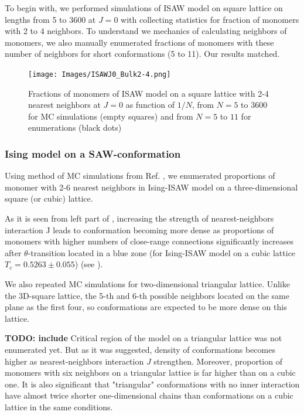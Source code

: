 \documentclass[a4paper]{jpconf}
\begin{document}
To begin with, we performed simulations of ISAW model on square lattice on lengths from 5 to 3600 at $J=0$ with collecting statistics for fraction of monomers with 2 to 4 neighbors. To understand we mechanics of calculating neighbors of monomers, we also manually enumerated fractions of monomers with these number of neighbors for short conformations (5 to 11). Our results matched.

\begin{figure}[h!]
    \centering
    \texttt{[image: Images/ISAWJ0\_Bulk2-4.png]}
    \caption{Fractions of monomers of ISAW model on a square lattice with 2-4 nearest neighbors at $J=0$ as function of $1/N$, from $N = 5$ to $3600$ for MC simulations (empty squares) and from $N = 5$ to $11$ for enumerations (black dots)}
    \label{fig:Ising_vs_ISAW}
\end{figure}

\subsubsection{Ising model on a SAW-conformation}

Using method of MC simulations from Ref. \cite{faizullina2021critical}, we enumerated proportions of monomer with 2-6 nearest neighbors in Ising-ISAW model on a three-dimensional square (or cubic) lattice.

As it is seen from left part of , increasing the strength of nearest-neighbors interaction J leads to conformation becoming more dense as proportions of monomers with higher numbers of close-range connections significantly increases after $\theta$-transition located in a blue zone (for Ising-ISAW model on a cubic lattice $T_{c} = 0.5263 \pm 0.055$\cite{Foster2021}) (see ).

We also repeated MC simulations for two-dimensional triangular lattice. Unlike the 3D-square lattice, the 5-th and 6-th possible neighbors located on the same plane as the first four, so conformations are expected to be more dense on this lattice.


\textbf{TODO: include}
Critical region of the model on a triangular lattice was not enumerated yet. But as it was suggested, density of conformations becomes higher as nearest-neighbors interaction $J$ strengthen. Moreover, proportion of monomers with six neighbors on a triangular lattice is far higher than on a cubic one. It is also significant that "triangular" conformations with no inner interaction have almost twice shorter one-dimensional chains than conformations on a cubic lattice in the same conditions.
\end{document}
